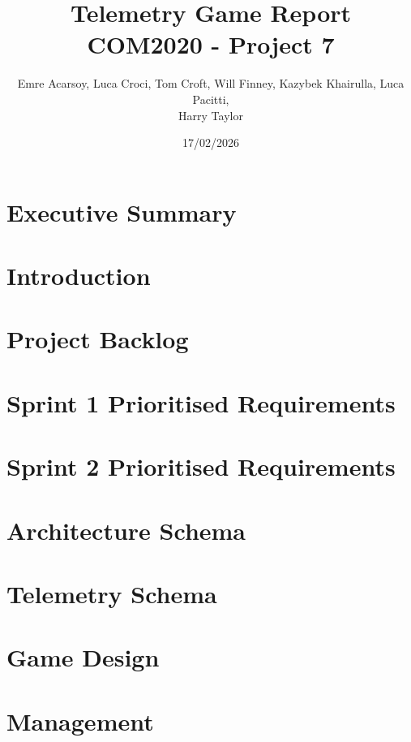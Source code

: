 \documentclass[11pt]{article}
\title{Telemetry Game Report\\[0.3em]
\large COM2020 - Project 7}
\author{Emre Acarsoy, Luca Croci, Tom Croft, Will Finney, Kazybek Khairulla, Luca Pacitti, \\ Harry Taylor}
\date{17/02/2026}
\begin{document}
\maketitle
\tableofcontents
\newpage

\section{Executive Summary}

\newpage

\section{Introduction}


\newpage

\section{Project Backlog}

\newpage

\section{Sprint 1 Prioritised Requirements}

\newpage

\section{Sprint 2 Prioritised Requirements}

\newpage

\section{Architecture Schema}

\newpage

\section{Telemetry Schema}

\newpage

\section{Game Design}

\newpage


\newpage

\section{Management}

\newpage
\end{document}
